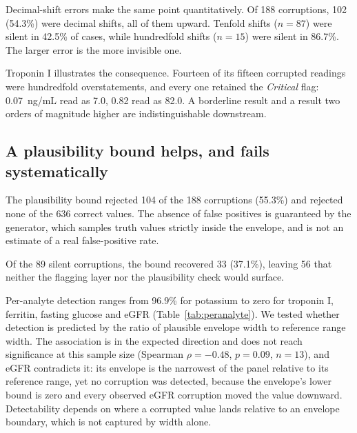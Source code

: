 \documentclass[11pt]{article}
\begin{document}
Decimal-shift errors make the same point quantitatively. Of 188 corruptions, 102
(54.3\%) were decimal shifts, all of them upward. Tenfold shifts
($n = 87$) were silent in 42.5\% of cases, while hundredfold shifts ($n = 15$) were
silent in 86.7\%. The larger error is the more invisible one.

Troponin I illustrates the consequence. Fourteen of its fifteen corrupted readings were
hundredfold overstatements, and every one retained the \emph{Critical} flag:
0.07~ng/mL read as 7.0, 0.82 read as 82.0. A
borderline result and a result two orders of magnitude higher are indistinguishable downstream.

\subsection{A plausibility bound helps, and fails systematically}

The plausibility bound rejected 104 of the 188 corruptions (55.3\%) and rejected
none of the 636 correct values. The absence of false positives is guaranteed by the generator,
which samples truth values strictly inside the envelope, and is not an estimate of a real
false-positive rate.

Of the 89 silent corruptions, the bound recovered 33 (37.1\%), leaving 56 that
neither the flagging layer nor the plausibility check would surface.

Per-analyte detection ranges from 96.9\% for potassium to zero for troponin I,
ferritin, fasting glucose and eGFR (Table~\ref{tab:peranalyte}). We tested whether detection is
predicted by the ratio of plausible envelope width to reference range width. The association is
in the expected direction and does not reach significance at this sample size
(Spearman $\rho = -0.48$, $p = 0.09$, $n = 13$), and eGFR contradicts it: its envelope is the
narrowest of the panel relative to its reference range, yet no corruption was detected, because
the envelope's lower bound is zero and every observed eGFR corruption moved the value downward.
Detectability depends on where a corrupted value lands relative to an envelope boundary, which
is not captured by width alone.
\end{document}

